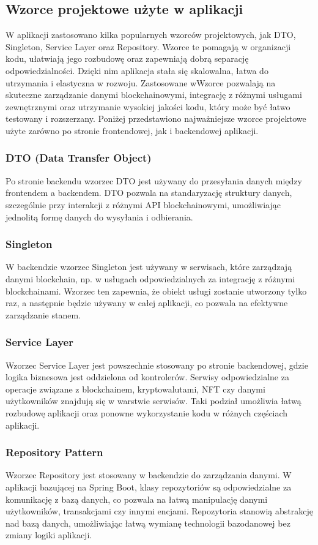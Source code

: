 \subsection{Wzorce projektowe użyte w aplikacji}

W aplikacji zastosowano kilka popularnych wzorców projektowych, jak DTO, Singleton, Service Layer oraz Repository. Wzorce te pomagają w organizacji kodu, ułatwiają jego rozbudowę oraz zapewniają dobrą separację odpowiedzialności. Dzięki nim aplikacja stała się skalowalna, łatwa do utrzymania i elastyczna w rozwoju. Zastosowane wWzorce pozwalają na skuteczne zarządzanie danymi blockchainowymi, integrację z różnymi usługami zewnętrznymi oraz utrzymanie wysokiej jakości kodu, który może być łatwo testowany i rozszerzany. Poniżej przedstawiono najważniejsze wzorce projektowe użyte zarówno po stronie frontendowej, jak i backendowej aplikacji.

\subsubsection{DTO (Data Transfer Object)}
Po stronie backendu wzorzec DTO jest używany do przesyłania danych między frontendem a backendem. DTO pozwala na standaryzację struktury danych, szczególnie przy interakcji z różnymi API blockchainowymi, umożliwiając jednolitą formę danych do wysyłania i odbierania.

\subsubsection{Singleton}
W backendzie wzorzec Singleton jest używany w serwisach, które zarządzają danymi blockchain, np. w usługach odpowiedzialnych za integrację z różnymi blockchainami. Wzorzec ten zapewnia, że obiekt usługi zostanie utworzony tylko raz, a następnie będzie używany w całej aplikacji, co pozwala na efektywne zarządzanie stanem.

\subsubsection{Service Layer}
Wzorzec Service Layer jest powszechnie stosowany po stronie backendowej, gdzie logika biznesowa jest oddzielona od kontrolerów. Serwisy odpowiedzialne za operacje związane z blockchainem, kryptowalutami, NFT czy danymi użytkowników znajdują się w warstwie serwisów. Taki podział umożliwia łatwą rozbudowę aplikacji oraz ponowne wykorzystanie kodu w różnych częściach aplikacji.

\subsubsection{Repository Pattern}
Wzorzec Repository jest stosowany w backendzie do zarządzania danymi. W aplikacji bazującej na Spring Boot, klasy repozytoriów są odpowiedzialne za komunikację z bazą danych, co pozwala na łatwą manipulację danymi użytkowników, transakcjami czy innymi encjami. Repozytoria stanowią abstrakcję nad bazą danych, umożliwiając łatwą wymianę technologii bazodanowej bez zmiany logiki aplikacji.

